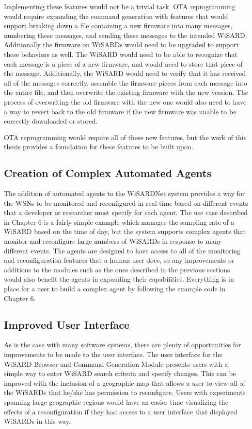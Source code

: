 Implementing these features would not be a trivial task. OTA reprogramming would require expanding the command generation with features that would support breaking down a file containing a new firmware into many messages, numbering these messages, and sending these messages to the intended WiSARD. Additionally the firmware on WiSARDs would need to be upgraded to support these behaviors as well. The WiSARD would need to be able to recognize that each message is a piece of a new firmware, and would need to store that piece of the message. Additionally, the WiSARD would need to verify that it has received all of the messages correctly, assemble the firmware pieces from each message into the entire file, and then overwrite the existing firmware with the new version. The process of overwriting the old firmware with the new one would also need to have a way to revert back to the old firmware if the new firmware was unable to be correctly downloaded or stored.

OTA reprogramming would require all of these new features, but the work of this thesis provides a foundation for these features to be built upon. 

\subsection{Creation of Complex Automated Agents}
The addition of automated agents to the WiSARDNet system provides a way for the WSNs to be monitored and reconfigured in real time based on different events that a developer or researcher must specify for each agent. The use case described in Chapter 6 is a fairly simple example which manages the sampling rate of a WiSARD based on the time of day, but the system supports complex agents that monitor and reconfigure large numbers of WiSARDs in response to many different events. The agents are designed to have access to all of the monitoring and reconfiguration features that a human user does, so any improvements or additions to the modules such as the ones described in the previous sections would also benefit the agents in expanding their capabilities. Everything is in place for a user to build a complex agent by following the example code in Chapter 6.

\subsection{Improved User Interface}
As is the case with many software systems, there are plenty of opportunities for improvements to be made to the user interface. The user interface for the WiSARD Browser and Command Generation Module presents users with a simple way to enter WiSARD search criteria and specify changes. This can be improved with the inclusion of a geographic map that allows a user to view all of the WiSARDs that he/she has permission to reconfigure. Users with experiments spanning large geographic regions would have an easier time visualizing the effects of a reconfiguration if they had access to a user interface that displayed WiSARDs in this way.

